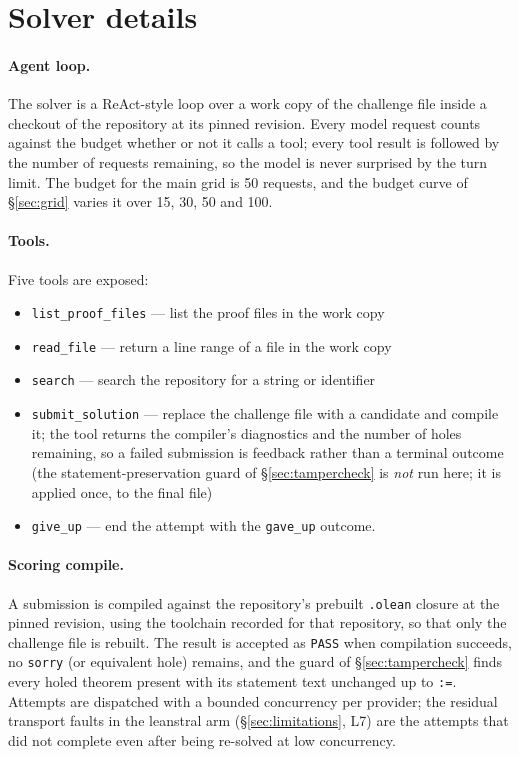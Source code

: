 \documentclass{article}
\begin{document}
\clearpage  %
\section{Solver details}
\label{app:solver}

\paragraph{Agent loop.} The solver is a ReAct-style loop over a work copy of the challenge file
inside a checkout of the repository at its pinned revision. Every model request counts against
the budget whether or not it calls a tool; every tool result is followed by the number of
requests remaining, so the model is never surprised by the turn limit. The budget for the main grid is 50 requests, and
the budget curve of \S\ref{sec:grid} varies it over 15, 30, 50 and 100.

\paragraph{Tools.} Five tools are exposed:
\begin{itemize}
  \item \texttt{list\_proof\_files} --- list the proof files in the work copy
  \item \texttt{read\_file} --- return a line range of a file in the work copy
  \item \texttt{search} --- search the repository for a string or identifier
  \item \texttt{submit\_solution} --- replace the challenge file with a candidate and compile it;
    the tool returns the compiler’s diagnostics and the number of holes remaining, so a failed
    submission is feedback rather than a terminal outcome (the statement-preservation guard of
    \S\ref{sec:tampercheck} is \emph{not} run here; it is applied once, to the final file)
  \item \texttt{give\_up} --- end the attempt with the \texttt{gave\_up} outcome.
\end{itemize}

\paragraph{Scoring compile.} A submission is compiled against the repository’s prebuilt
\texttt{.olean} closure at the pinned revision, using the toolchain recorded for that
repository, so that only the challenge file is rebuilt. The result is accepted as
\texttt{PASS} when compilation succeeds, no \texttt{sorry} (or equivalent hole) remains, and the
guard of \S\ref{sec:tampercheck} finds every holed theorem present with its statement text
unchanged up to \texttt{:=}. Attempts are dispatched with a bounded concurrency per provider;
the residual transport faults in the leanstral arm (\S\ref{sec:limitations}, L7) are the
attempts that did not complete even after being re-solved at low concurrency.
\end{document}
